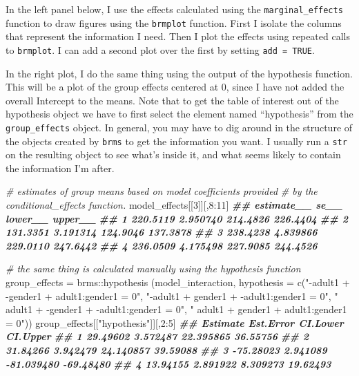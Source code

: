 \documentclass[
]{book}
\newenvironment{Shaded}{\begin{snugshade}}{\end{snugshade}}
\newcommand{\AttributeTok}[1]{\textcolor[rgb]{0.77,0.63,0.00}{#1}}
\newcommand{\CommentTok}[1]{\textcolor[rgb]{0.56,0.35,0.01}{\textit{#1}}}
\newcommand{\DecValTok}[1]{\textcolor[rgb]{0.00,0.00,0.81}{#1}}
\newcommand{\DocumentationTok}[1]{\textcolor[rgb]{0.56,0.35,0.01}{\textbf{\textit{#1}}}}
\newcommand{\FunctionTok}[1]{\textcolor[rgb]{0.00,0.00,0.00}{#1}}
\newcommand{\NormalTok}[1]{#1}
\newcommand{\OtherTok}[1]{\textcolor[rgb]{0.56,0.35,0.01}{#1}}
\newcommand{\SpecialCharTok}[1]{\textcolor[rgb]{0.00,0.00,0.00}{#1}}
\newcommand{\StringTok}[1]{\textcolor[rgb]{0.31,0.60,0.02}{#1}}
\begin{document}
In the left panel below, I use the effects calculated using the \texttt{marginal\_effects} function to draw figures using the \texttt{brmplot} function. First I isolate the columns that represent the information I need. Then I plot the effects using repeated calls to \texttt{brmplot}. I can add a second plot over the first by setting \texttt{add\ =\ TRUE}.

In the right plot, I do the same thing using the output of the hypothesis function. This will be a plot of the group effects centered at 0, since I have not added the overall Intercept to the means. Note that to get the table of interest out of the hypothesis object we have to first select the element named ``hypothesis'' from the \texttt{group\_effects} object. In general, you may have to dig around in the structure of the objects created by \texttt{brms} to get the information you want. I usually run a \texttt{str} on the resulting object to see what's inside it, and what seems likely to contain the information I'm after.

\begin{Shaded}
\begin{Highlighting}[]
\CommentTok{\# estimates of group means based on model coefficients provided}
\CommentTok{\# by the conditional\_effects function.}
\NormalTok{model\_effects[[}\DecValTok{3}\NormalTok{]][,}\DecValTok{8}\SpecialCharTok{:}\DecValTok{11}\NormalTok{]}
\DocumentationTok{\#\#   estimate\_\_     se\_\_  lower\_\_  upper\_\_}
\DocumentationTok{\#\# 1   220.5119 2.950740 214.4826 226.4404}
\DocumentationTok{\#\# 2   131.3351 3.191314 124.9046 137.3878}
\DocumentationTok{\#\# 3   238.4238 4.839866 229.0110 247.6442}
\DocumentationTok{\#\# 4   236.0509 4.175498 227.9085 244.4526}

\CommentTok{\# the same thing is calculated \textquotesingle{}manually\textquotesingle{} using the hypothesis function}
\NormalTok{group\_effects }\OtherTok{=} 
\NormalTok{  brms}\SpecialCharTok{::}\FunctionTok{hypothesis}\NormalTok{ (model\_interaction, }\AttributeTok{hypothesis =} 
                \FunctionTok{c}\NormalTok{(}\StringTok{"{-}adult1 + {-}gender1 +  adult1:gender1 = 0"}\NormalTok{,}
                  \StringTok{"{-}adult1 +  gender1 + {-}adult1:gender1 = 0"}\NormalTok{,}
                  \StringTok{" adult1 + {-}gender1 + {-}adult1:gender1 = 0"}\NormalTok{,}
                  \StringTok{" adult1 +  gender1 +  adult1:gender1 = 0"}\NormalTok{))}
\NormalTok{group\_effects[[}\StringTok{"hypothesis"}\NormalTok{]][,}\DecValTok{2}\SpecialCharTok{:}\DecValTok{5}\NormalTok{]}
\DocumentationTok{\#\#    Estimate Est.Error   CI.Lower  CI.Upper}
\DocumentationTok{\#\# 1  29.49602  3.572487  22.395865  36.55756}
\DocumentationTok{\#\# 2  31.84266  3.942479  24.140857  39.59088}
\DocumentationTok{\#\# 3 {-}75.28023  2.941089 {-}81.039480 {-}69.48480}
\DocumentationTok{\#\# 4  13.94155  2.891922   8.309273  19.62493}
\end{Highlighting}
\end{Shaded}
\end{document}
